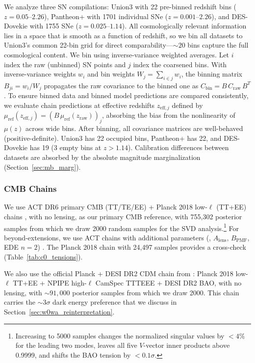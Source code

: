 We analyze three SN compilations: Union3 \citep{Union3} with 22 pre-binned redshift bins ($z = 0.05$--$2.26$), Pantheon+ \citep{PantheonPlus} with 1701 individual SNe ($z = 0.001$--$2.26$), and DES-Dovekie \citep{Popovic2025} with 1755 SNe ($z = 0.025$--$1.14$). All cosmologically relevant information lies in a space that is smooth as a function of redshift, so we bin all datasets to Union3's common 22-bin grid for direct comparability---$\sim 20$ bins capture the full cosmological content. We bin using inverse-variance weighted averages. Let $i$ index the raw (unbinned) SN points and $j$ index the coarsened bins. With inverse-variance weights $w_i$ and bin weights $W_j = \sum_{i \in j} w_i$, the binning matrix $B_{ji} = w_i / W_j$ propagates the raw covariance to the binned one as $C_\mathrm{bin} = B\, C_\mathrm{raw}\, B^T$. To ensure binned data and binned model predictions are compared consistently, we evaluate chain predictions at effective redshifts $z_{\mathrm{eff},j}$ defined by $\mu_\mathrm{ref}(z_{\mathrm{eff},j}) = (B\,\mu_\mathrm{ref}(z_\mathrm{raw}))_j$, absorbing the bias from the nonlinearity of $\mu(z)$ across wide bins. After binning, all covariance matrices are well-behaved (positive-definite). Union3 has 22 occupied bins, Pantheon+ has 22, and DES-Dovekie has 19 (3 empty bins at $z > 1.14$). Calibration differences between datasets are absorbed by the absolute magnitude \MB marginalization (Section~\ref{sec:mb_marg}).

\subsubsection{CMB Chains}

We use ACT DR6 primary CMB (TT/TE/EE) + Planck 2018 low-$\ell$ (TT+EE) \LCDM chains \citep{ACT_DR6}, with no lensing, as our primary CMB reference, with 755,302 posterior samples from which we draw 2000 random samples for the SVD analysis.\footnote{Increasing to 5000 samples changes the normalized singular values by $< 4\%$ for the leading two modes, leaves all five $V$-vector inner products above 0.9999, and shifts the BAO \czero tension by $< 0.1\sigma$.} For beyond-\LCDM extensions, we use ACT chains with additional parameters (\Omk, $A_\mathrm{lens}$, $B_\mathrm{PMF}$, EDE $n=2$) \citep{ACT_DR6_extended}. The Planck 2018 chain \citep{Planck2018_cosmo} with 24,497 samples provides a cross-check (Table~\ref{tab:c0_tensions}).

We also use the official Planck + DESI DR2 \wowa{}CDM chain from \citet{DESI_DR2_cosmo}: Planck 2018 low-$\ell$ TT+EE + NPIPE high-$\ell$ CamSpec TTTEEE + DESI DR2 BAO, with no lensing, with ${\sim}91{,}000$ posterior samples from which we draw 2000. This chain carries the ${\sim}3\sigma$ dark energy preference that we discuss in Section~\ref{sec:w0wa_reinterpretation}.

